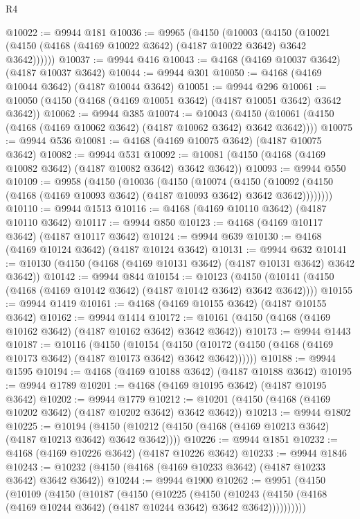 \begin{lexlean}{R4}
\begin{coremodule}
@10022 := @9944 @181
@10036 := @9965
    (@4150
      (@10003
        (@4150 (@10021 (@4150 (@4168 (@4169 @10022 @3642) (@4187 @10022 @3642) @3642 @3642))))))
@10037 := @9944 @416
@10043 := @4168 (@4169 @10037 @3642) (@4187 @10037 @3642)
@10044 := @9944 @301
@10050 := @4168 (@4169 @10044 @3642) (@4187 @10044 @3642)
@10051 := @9944 @296
@10061 := @10050 (@4150 (@4168 (@4169 @10051 @3642) (@4187 @10051 @3642) @3642 @3642))
@10062 := @9944 @385
@10074 := @10043
    (@4150 (@10061 (@4150 (@4168 (@4169 @10062 @3642) (@4187 @10062 @3642) @3642 @3642))))
@10075 := @9944 @536
@10081 := @4168 (@4169 @10075 @3642) (@4187 @10075 @3642)
@10082 := @9944 @531
@10092 := @10081 (@4150 (@4168 (@4169 @10082 @3642) (@4187 @10082 @3642) @3642 @3642))
@10093 := @9944 @550
@10109 := @9958
    (@4150
      (@10036
        (@4150
          (@10074
            (@4150
              (@10092 (@4150 (@4168 (@4169 @10093 @3642) (@4187 @10093 @3642) @3642 @3642))))))))
@10110 := @9944 @1513
@10116 := @4168 (@4169 @10110 @3642) (@4187 @10110 @3642)
@10117 := @9944 @850
@10123 := @4168 (@4169 @10117 @3642) (@4187 @10117 @3642)
@10124 := @9944 @639
@10130 := @4168 (@4169 @10124 @3642) (@4187 @10124 @3642)
@10131 := @9944 @632
@10141 := @10130 (@4150 (@4168 (@4169 @10131 @3642) (@4187 @10131 @3642) @3642 @3642))
@10142 := @9944 @844
@10154 := @10123
    (@4150 (@10141 (@4150 (@4168 (@4169 @10142 @3642) (@4187 @10142 @3642) @3642 @3642))))
@10155 := @9944 @1419
@10161 := @4168 (@4169 @10155 @3642) (@4187 @10155 @3642)
@10162 := @9944 @1414
@10172 := @10161 (@4150 (@4168 (@4169 @10162 @3642) (@4187 @10162 @3642) @3642 @3642))
@10173 := @9944 @1443
@10187 := @10116
    (@4150
      (@10154
        (@4150 (@10172 (@4150 (@4168 (@4169 @10173 @3642) (@4187 @10173 @3642) @3642 @3642))))))
@10188 := @9944 @1595
@10194 := @4168 (@4169 @10188 @3642) (@4187 @10188 @3642)
@10195 := @9944 @1789
@10201 := @4168 (@4169 @10195 @3642) (@4187 @10195 @3642)
@10202 := @9944 @1779
@10212 := @10201 (@4150 (@4168 (@4169 @10202 @3642) (@4187 @10202 @3642) @3642 @3642))
@10213 := @9944 @1802
@10225 := @10194
    (@4150 (@10212 (@4150 (@4168 (@4169 @10213 @3642) (@4187 @10213 @3642) @3642 @3642))))
@10226 := @9944 @1851
@10232 := @4168 (@4169 @10226 @3642) (@4187 @10226 @3642)
@10233 := @9944 @1846
@10243 := @10232 (@4150 (@4168 (@4169 @10233 @3642) (@4187 @10233 @3642) @3642 @3642))
@10244 := @9944 @1900
@10262 := @9951
    (@4150
      (@10109
        (@4150
          (@10187
            (@4150
              (@10225
                (@4150
                  (@10243
                    (@4150 (@4168 (@4169 @10244 @3642) (@4187 @10244 @3642) @3642 @3642))))))))))

\end{coremodule}
\end{lexlean}
